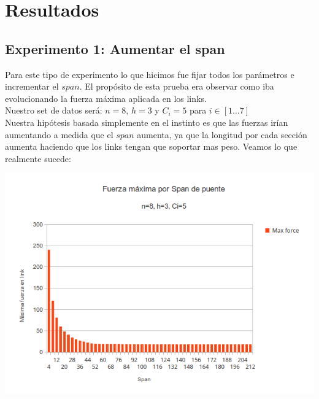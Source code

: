 \section{Resultados}

\subsection{Experimento 1: Aumentar el span}

Para este tipo de experimento lo que hicimos fue fijar todos los parámetros e incrementar el $span$. El propósito de esta prueba era observar como iba evolucionando la fuerza máxima aplicada en los links.\\

Nuestro set de datos será: $n = 8$, $h = 3$ y $C_i = 5$ para $i \in [1 \dots 7]$\\

Nuestra hipótesis basada simplemente en el instinto es que las fuerzas irían aumentando a medida que el $span$ aumenta, ya que la longitud por cada sección aumenta haciendo que los links tengan que soportar mas peso. Veamos lo que realmente sucede:

\begin{center}
\includegraphics[scale=0.8]{archivos/graficos/Fuerza-x-span.png}\\
\end{center}

